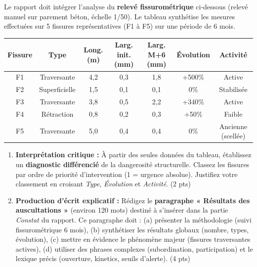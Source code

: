 \documentclass[11pt]{article}
\begin{document}
\begin{exercice}
Le rapport doit intégrer l'analyse du \textbf{relevé fissurométrique} ci-dessous (relevé manuel sur parement béton, échelle 1/50). Le tableau synthétise les mesures effectuées sur 5 fissures représentatives (F1 à F5) sur une période de 6 mois.

\begin{center}
\begin{tabular}{|c|c|c|c|c|c|c|}
\hline
\textbf{Fissure} & \textbf{Type} & \textbf{Long. (m)} & \textbf{Larg. init. (mm)} & \textbf{Larg. M+6 (mm)} & \textbf{Évolution} & \textbf{Activité} \\
\hline
F1 & Traversante & 4,2 & 0,3 & 1,8 & +500\% & Active \\
\hline
F2 & Superficielle & 1,5 & 0,1 & 0,1 & 0\% & Stabilisée \\
\hline
F3 & Traversante & 3,8 & 0,5 & 2,2 & +340\% & Active \\
\hline
F4 & Rétraction & 0,8 & 0,2 & 0,3 & +50\% & Faible \\
\hline
F5 & Traversante & 5,0 & 0,4 & 0,4 & 0\% & Ancienne (scellée) \\
\hline
\end{tabular}
\end{center}

\begin{enumerate}
    \item \textbf{Interprétation critique :} À partir des seules données du tableau, établissez un \textbf{diagnostic différencié} de la dangerosité structurelle. Classez les fissures par ordre de priorité d'intervention (1 = urgence absolue). Justifiez votre classement en croisant \textit{Type}, \textit{Évolution} et \textit{Activité}. (2 pts)
    \item \textbf{Production d'écrit explicatif :} Rédigez le \textbf{paragraphe « Résultats des auscultations »} (environ 120 mots) destiné à s'insérer dans la partie \textit{Constat} du rapport. Ce paragraphe doit : (a) présenter la méthodologie (suivi fissurométrique 6 mois), (b) synthétiser les résultats globaux (nombre, types, évolution), (c) mettre en évidence le phénomène majeur (fissures traversantes actives), (d) utiliser des phrases complexes (subordination, participation) et le lexique précis (ouverture, kinetics, seuils d'alerte). (4 pts)
\end{enumerate}
\end{exercice}
\end{document}
